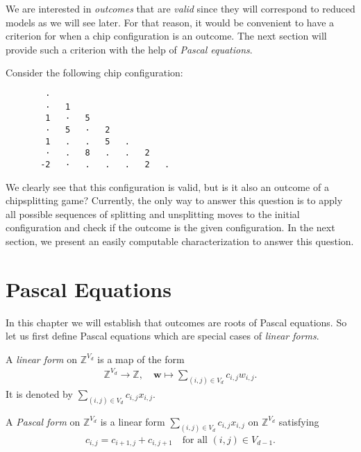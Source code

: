 We are interested in \emph{outcomes} that are \emph{valid} since they will correspond to reduced models as we will see later. For that reason, it would be convenient to have a criterion for when a chip configuration is an outcome. The next section will provide such a criterion with the help of \emph{Pascal equations}.

\begin{example}\label{ex:dknfkdjsfnsdj}
    Consider the following chip configuration:
    \begin{verbatim}
        · 
        ·   1 
        1   ·   5 
        ·   5   ·   2 
        1   .   .   5   . 
        ·   .   8   .   .   2 
       -2   ·   .   .   .   2   . 
    \end{verbatim}
    We clearly see that this configuration is valid, but is it also an outcome of a chipsplitting game? Currently, the only way to answer this question is to apply all possible sequences of splitting and unsplitting moves to the initial configuration and check if the outcome is the given configuration. In the next section, we present an easily computable characterization to answer this question.
\end{example}



\section{Pascal Equations}

In this chapter we will establish that outcomes are roots of Pascal equations. So let us first define Pascal equations which are special cases of \emph{linear forms}.

\begin{definition}
    A \emph{linear form} on \( \mathbb{Z}^{V_d} \) is a map of the form
    \begin{align*}
        \mathbb{Z}^{V_d} \to \mathbb{Z}, \quad \mathbf{w} \mapsto \sum_{(i,j) \in V_d} c_{i,j} w_{i,j}.
    \end{align*}
    It is denoted by \( \sum_{(i,j) \in V_d} c_{i,j} x_{i,j} \).
\end{definition}

\begin{definition}
    A \emph{Pascal form} on \( \mathbb{Z}^{V_d} \) is a linear form \( \sum_{(i,j) \in V_d} c_{i,j} x_{i,j} \) on \( \mathbb{Z}^{V_d} \) satisfying 
    \begin{align*}
        c_{i,j} = c_{i+1,j} + c_{i,j+1} \quad \text{for all } (i,j) \in V_{d-1}.
    \end{align*}
\end{definition}

